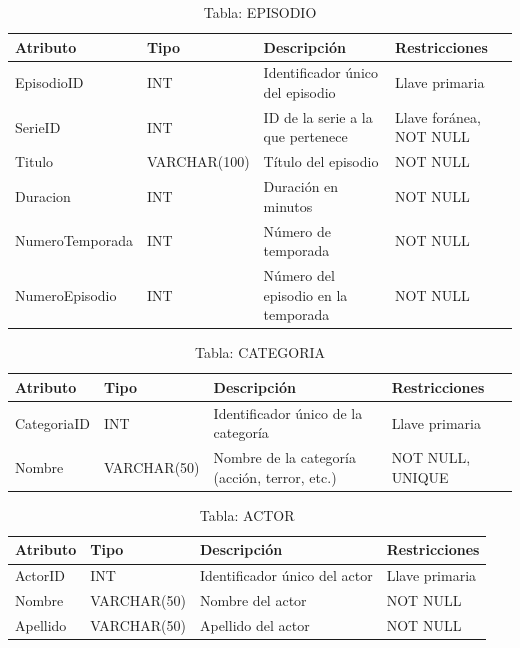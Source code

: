 \documentclass[12pt, a4paper]{article}
\begin{document}
\begin{table}[ht]
\centering
\caption{Tabla: EPISODIO}
\begin{tabular}{|l|l|p{4.5cm}|p{3.5cm}|}
\hline
\textbf{Atributo} & \textbf{Tipo} & \textbf{Descripción} &
\textbf{Restricciones} \\
\hline
EpisodioID & INT & Identificador único del episodio & Llave primaria \\
\hline
SerieID & INT & ID de la serie a la que pertenece & Llave foránea, NOT NULL \\
\hline
Titulo & VARCHAR(100) & Título del episodio & NOT NULL \\
\hline
Duracion & INT & Duración en minutos & NOT NULL \\
\hline
NumeroTemporada & INT & Número de temporada & NOT NULL \\
\hline
NumeroEpisodio & INT & Número del episodio en la temporada & NOT NULL \\
\hline
\end{tabular}
\end{table}
\newpage

\begin{table}[ht]
\centering
\caption{Tabla: CATEGORIA}
\begin{tabular}{|l|l|p{4.5cm}|p{3.5cm}|}
\hline
\textbf{Atributo} & \textbf{Tipo} & \textbf{Descripción} &
\textbf{Restricciones} \\
\hline
CategoriaID & INT & Identificador único de la categoría & Llave primaria \\
\hline
Nombre & VARCHAR(50) & Nombre de la categoría (acción, terror, etc.) & NOT NULL,
UNIQUE \\
\hline
\end{tabular}
\end{table}
\newpage

\begin{table}[ht]
\centering
\caption{Tabla: ACTOR}
\begin{tabular}{|l|l|p{4.5cm}|p{3.5cm}|}
\hline
\textbf{Atributo} & \textbf{Tipo} & \textbf{Descripción} &
\textbf{Restricciones} \\
\hline
ActorID & INT & Identificador único del actor & Llave primaria \\
\hline
Nombre & VARCHAR(50) & Nombre del actor & NOT NULL \\
\hline
Apellido & VARCHAR(50) & Apellido del actor & NOT NULL \\
\hline
\end{tabular}
\end{table}
\newpage
\end{document}
